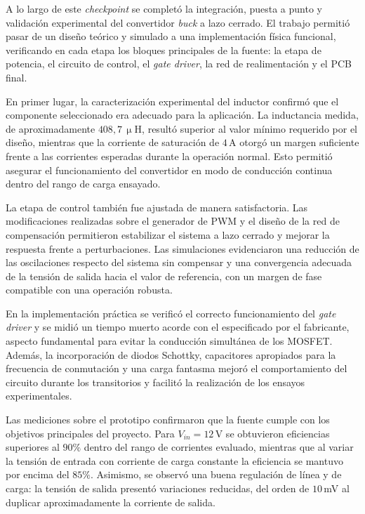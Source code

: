 A lo largo de este \textit{checkpoint} se complet\'o la integraci\'on, puesta a punto y validaci\'on experimental del convertidor \textit{buck} a lazo cerrado. El trabajo permiti\'o pasar de un dise\~no te\'orico y simulado a una implementaci\'on f\'isica funcional, verificando en cada etapa los bloques principales de la fuente: la etapa de potencia, el circuito de control, el \textit{gate driver}, la red de realimentaci\'on y el PCB final.

En primer lugar, la caracterizaci\'on experimental del inductor confirm\'o que el componente seleccionado era adecuado para la aplicaci\'on. La inductancia medida, de aproximadamente $408{,}7\,\upmu$H, result\'o superior al valor m\'inimo requerido por el dise\~no, mientras que la corriente de saturaci\'on de $4\,$A otorg\'o un margen suficiente frente a las corrientes esperadas durante la operaci\'on normal. Esto permiti\'o asegurar el funcionamiento del convertidor en modo de conducci\'on continua dentro del rango de carga ensayado.

La etapa de control tambi\'en fue ajustada de manera satisfactoria. Las modificaciones realizadas sobre el generador de PWM y el dise\~no de la red de compensaci\'on permitieron estabilizar el sistema a lazo cerrado y mejorar la respuesta frente a perturbaciones. Las simulaciones evidenciaron una reducci\'on de las oscilaciones respecto del sistema sin compensar y una convergencia adecuada de la tensi\'on de salida hacia el valor de referencia, con un margen de fase compatible con una operaci\'on robusta.

En la implementaci\'on pr\'actica se verific\'o el correcto funcionamiento del \textit{gate driver} y se midi\'o un tiempo muerto acorde con el especificado por el fabricante, aspecto fundamental para evitar la conducci\'on simult\'anea de los MOSFET. Adem\'as, la incorporaci\'on de diodos Schottky, capacitores apropiados para la frecuencia de conmutaci\'on y una carga fantasma mejor\'o el comportamiento del circuito durante los transitorios y facilit\'o la realizaci\'on de los ensayos experimentales.

Las mediciones sobre el prototipo confirmaron que la fuente cumple con los objetivos principales del proyecto. Para $V_{in}=12\,$V se obtuvieron eficiencias superiores al $90\%$ dentro del rango de corrientes evaluado, mientras que al variar la tensi\'on de entrada con corriente de carga constante la eficiencia se mantuvo por encima del $85\%$. Asimismo, se observ\'o una buena regulaci\'on de l\'inea y de carga: la tensi\'on de salida present\'o variaciones reducidas, del orden de $10\,$mV al duplicar aproximadamente la corriente de salida.

